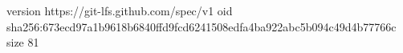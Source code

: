 version https://git-lfs.github.com/spec/v1
oid sha256:673ecd97a1b9618b6840ffd9fcd6241508edfa4ba922abc5b094c49d4b77766c
size 81
